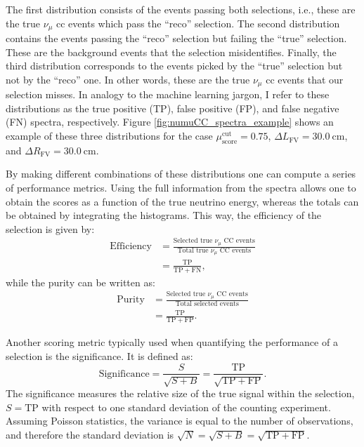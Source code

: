 The first distribution consists of the events passing both selections, i.e., these are the true $\nu_{\mu}$ \gls{cc} events which pass the ``reco'' selection. The second distribution contains the events passing the ``reco'' selection but failing the ``true'' selection. These are the background events that the selection misidentifies. Finally, the third distribution corresponds to the events picked by the ``true'' selection but not by the ``reco'' one. In other words, these are the true $\nu_{\mu}$ \gls{cc} events that our selection misses. In analogy to the machine learning jargon, I refer to these distributions as the true positive (TP), false positive (FP), and false negative (FN) spectra, respectively. Figure \ref{fig:numuCC_spectra_example} shows an example of these three distributions for the case $\mu_{\mathrm{score}}^{\mathrm{cut}} = 0.75$, $\Delta L_{\mathrm{FV}} = 30.0 ~ \mathrm{cm}$, and $\Delta R_{\mathrm{FV}} = 30.0 ~ \mathrm{cm}$.

By making different combinations of these distributions one can compute a series of performance metrics. Using the full information from the spectra allows one to obtain the scores as a function of the true neutrino energy, whereas the totals can be obtained by integrating the histograms. This way, the efficiency of the selection is given by:
\begin{equation}
    \begin{split}
        \mathrm{Efficiency} &= \frac{\text{Selected true } \nu_{\mu} \text{ CC events}}{\text{Total true } \nu_{\mu} \text{ CC events}}\\
        &= \frac{\mathrm{TP}}{\mathrm{TP}+\mathrm{FN}},
    \end{split}
\end{equation}
while the purity can be written as:
\begin{equation}
    \begin{split}
        \mathrm{Purity} &= \frac{\text{Selected true } \nu_{\mu} \text{ CC events}}{\text{Total selected events}}\\
        &= \frac{\mathrm{TP}}{\mathrm{TP}+\mathrm{FP}}.
    \end{split}
\end{equation}

Another scoring metric typically used when quantifying the performance of a selection is the significance. It is defined as:
\begin{equation}
    \mathrm{Significance} = \frac{S}{\sqrt{S+B}} = \frac{\mathrm{TP}}{\sqrt{\mathrm{TP} + \mathrm{FP}}}.
\end{equation}
The significance measures the relative size of the true signal within the selection, $S=\mathrm{TP}$ with respect to one standard deviation of the counting experiment. Assuming Poisson statistics, the variance is equal to the number of observations, and therefore the standard deviation is $\sqrt{N}=\sqrt{S+B}=\sqrt{\mathrm{TP} + \mathrm{FP}}$.

